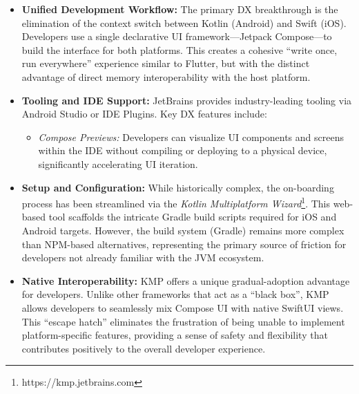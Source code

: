 \begin{itemize}
    \item \textbf{Unified Development Workflow:} The primary DX breakthrough is the elimination of the context switch between Kotlin (Android) and Swift (iOS). Developers use a single declarative UI framework—Jetpack Compose—to build the interface for both platforms. This creates a cohesive ``write once, run everywhere'' experience similar to Flutter, but with the distinct advantage of direct memory interoperability with the host platform.
    
    \item \textbf{Tooling and IDE Support:} JetBrains provides industry-leading tooling via Android Studio or IDE Plugins. Key DX features include:
    \begin{itemize}
        \item \textit{Compose Previews:} Developers can visualize UI components and screens within the IDE without compiling or deploying to a physical device, significantly accelerating UI iteration.~\cite{DX:KMM:02}
    \end{itemize}

    \item \textbf{Setup and Configuration:} While historically complex, the on-boarding process has been streamlined via the \textit{Kotlin Multiplatform Wizard}\footnote{https://kmp.jetbrains.com}. This web-based tool scaffolds the intricate Gradle build scripts required for iOS and Android targets. However, the build system (Gradle) remains more complex than NPM-based alternatives, representing the primary source of friction for developers not already familiar with the JVM ecosystem.

    \item \textbf{Native Interoperability:} KMP offers a unique gradual-adoption advantage for developers. Unlike other frameworks that act as a ``black box'', KMP allows developers to seamlessly mix Compose UI with native SwiftUI views. This ``escape hatch'' eliminates the frustration of being unable to implement platform-specific features, providing a sense of safety and flexibility that contributes positively to the overall developer experience.\ \cite{DX:KMM:03}
\end{itemize}

